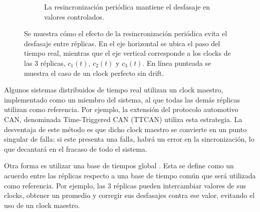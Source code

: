 \begin{figure}[H]
\begin{subfigure}[b]{0.48\textwidth}
        \caption{La resincronización periódica mantiene el desfasaje en valores controlados.}
        \label{fig:esquema_resincronizacion}
    \end{subfigure}
       \caption{Se muestra cómo el efecto de la resincronización periódica evita el desfasaje entre réplicas. En el eje horizontal se ubica el paso del tiempo real, mientras que el eje vertical corresponde a los clocks de las 3 réplicas, $c_1(t)$, $c_2(t)$ y $c_3(t)$. En línea punteada se muestra el caso de un clock perfecto sin drift.}
       \label{fig:esquema_desinc_resinc}
\end{figure}


Algunos sistemas distribuidos de tiempo real utilizan un clock maestro, implementado como un miembro del sistema, al que todas las demás réplicas utilizan como referencia. Por ejemplo, la extensión del protocolo automotivo CAN, denominada Time-Triggered CAN (TTCAN) \cite{leen2002ttcan} utiliza esta estrategia. La desventaja de este método es que dicho clock maestro se convierte en un punto singular de falla: si este presenta una falla, habrá un error en la sincronización, lo que decantará en el fracaso de todo el sistema.

Otra forma es utilizar una base de tiempos global \cite[p.~51]{kopetz-2011}. Esta se define como un acuerdo entre las réplicas respecto a una base de tiempo común que será utilizada como referencia. Por ejemplo, las 3 réplicas pueden intercambiar valores de sus clocks, obtener un promedio y corregir sus desfasajes contra ese valor, evitando el uso de un clock maestro. %

